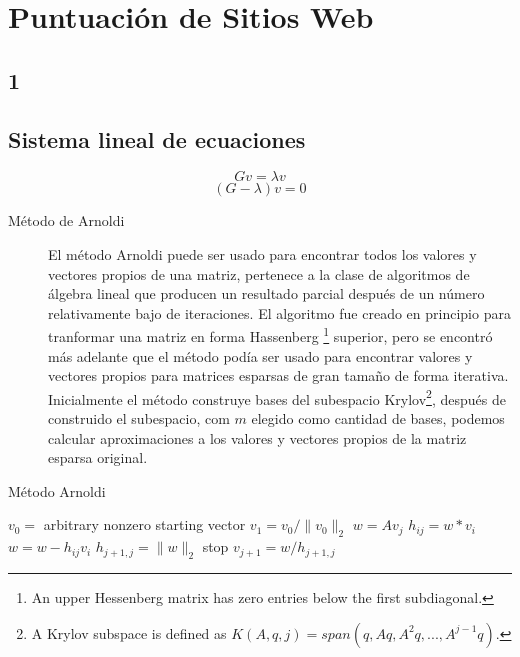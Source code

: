 \documentclass{article}
\begin{document}

\section{Puntuación de Sitios Web}

\subsection{1}
\subsection{Sistema lineal de ecuaciones}
\begin{equation} \label{eq:SLi}
Gv = \lambda v
\end{equation}
\begin{equation} \label{eq:SL}
(G-\lambda)v = 0
\end{equation}

\begin{description}
\item[Método de Arnoldi] El método Arnoldi puede ser usado para encontrar todos los valores y vectores propios de una matriz, pertenece a la clase de algoritmos de álgebra lineal que producen un resultado parcial después de un número relativamente bajo de iteraciones. El algoritmo fue creado en principio para tranformar una matriz en forma Hassenberg \footnote{An upper Hessenberg matrix has zero entries below the first subdiagonal.} superior, pero se encontró más adelante que el método podía ser usado para encontrar valores y vectores propios para matrices esparsas de gran tamaño de forma iterativa. Inicialmente el método construye bases del subespacio Krylov\footnote{A Krylov subspace is defined as $K(A, q, j) = span(q, Aq, A^{2}q,...,A^{j-1}q)$.}, después de construido el subespacio, com $m$ elegido como cantidad de bases, podemos calcular aproximaciones a los valores y vectores propios de la matriz esparsa original.



\end{description}

\begin{algorithm}
\caption{Método Arnoldi}\label{alg:arnoldi}
\begin{algorithmic}[1]
\State $v_{0} = $ arbitrary nonzero starting vector
\State $v_{1} = v_{0}/\|v_{0}\|_{2}$ 
\State $w = Av_{j}$
\State $h_{ij} = w*v_{i}$
\State $w = w - h_{ij}v_{i}$
\EndFor
\State $h_{j+1,j} = \|w\|_{2}$
stop
\EndIf
\State $v_{j+1} = w/h_{j+1,j}$
\EndFor
\EndProcedure
\end{algorithmic}
\end{algorithm}
\end{document}
